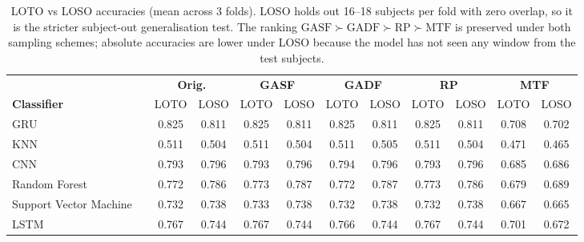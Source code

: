 \begin{table}[H]
\centering
\caption{LOTO vs LOSO accuracies (mean across 3 folds). LOSO holds out 16--18 subjects per fold with zero overlap, so it is the stricter subject-out generalisation test. The ranking $\text{GASF}\succ\text{GADF}\succ\text{RP}\succ\text{MTF}$ is preserved under both sampling schemes; absolute accuracies are lower under LOSO because the model has not seen any window from the test subjects.}
\label{tab:loto_vs_loso}
\setlength{\tabcolsep}{3pt}
\footnotesize
\begin{tabular}{ll|cc|cc|cc|cc|cc}
\toprule
 & & \multicolumn{2}{c|}{\textbf{Orig.}} & \multicolumn{2}{c|}{\textbf{GASF}} & \multicolumn{2}{c|}{\textbf{GADF}} & \multicolumn{2}{c|}{\textbf{RP}} & \multicolumn{2}{c}{\textbf{MTF}} \\
\textbf{Classifier} & & LOTO & LOSO & LOTO & LOSO & LOTO & LOSO & LOTO & LOSO & LOTO & LOSO \\
\midrule
GRU &  & 0.825 & 0.811 & 0.825 & 0.811 & 0.825 & 0.811 & 0.825 & 0.811 & 0.708 & 0.702 \\
KNN &  & 0.511 & 0.504 & 0.511 & 0.504 & 0.511 & 0.505 & 0.511 & 0.504 & 0.471 & 0.465 \\
CNN &  & 0.793 & 0.796 & 0.793 & 0.796 & 0.794 & 0.796 & 0.793 & 0.796 & 0.685 & 0.686 \\
Random Forest &  & 0.772 & 0.786 & 0.773 & 0.787 & 0.772 & 0.787 & 0.773 & 0.786 & 0.679 & 0.689 \\
Support Vector Machine &  & 0.732 & 0.738 & 0.733 & 0.738 & 0.732 & 0.738 & 0.732 & 0.738 & 0.667 & 0.665 \\
LSTM &  & 0.767 & 0.744 & 0.767 & 0.744 & 0.766 & 0.744 & 0.767 & 0.744 & 0.701 & 0.672 \\
\bottomrule
\end{tabular}
\end{table}

